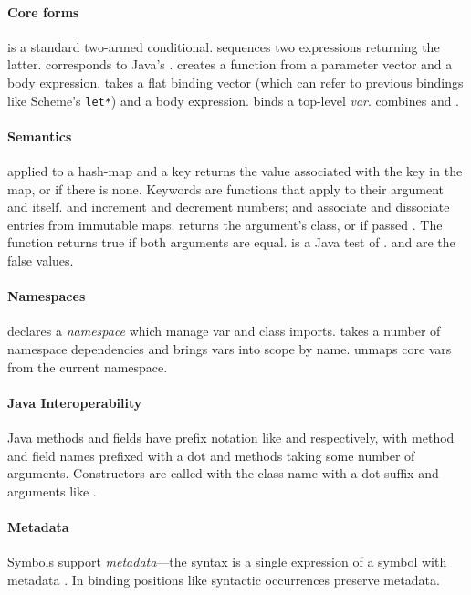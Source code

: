 \paragraph{Core forms}  is a standard two-armed conditional.
 sequences two expressions returning the latter.
 corresponds to Java's .
 creates a function from a parameter vector and a body expression.
 takes a flat binding vector (which can refer to previous bindings like Scheme's \texttt{let*})
and a body expression.
 binds a top-level \emph{var}.
 combines  and .

\paragraph{Semantics}  applied to a hash-map and a key returns the value
associated with the key in the map, or  if there is none.
Keywords are functions that apply  to their argument
and itself.
 and  increment and decrement numbers;
 and  associate and dissociate entries
from immutable maps.
 returns the argument's class, or  if passed .
The \clj{=} function returns true if both arguments are equal.
 is
a Java  test of .
 and  are the false values.

\paragraph{Namespaces} 
declares a
\emph{namespace}
which manage var and class imports. 
 takes a number of namespace dependencies and 
brings vars into scope by name.
  unmaps core vars from the current namespace.


\paragraph{Java Interoperability} Java methods and fields have prefix notation
like  and  respectively,
with method and field names prefixed with a dot and methods taking some number of arguments.
Constructors are called with the class name with a dot suffix and arguments like .

\paragraph{Metadata} Symbols support \emph{metadata}---the syntax 
is a single expression of a symbol  with metadata .
In binding positions like 
syntactic occurrences preserve metadata.

